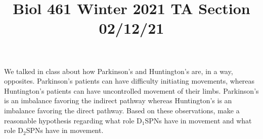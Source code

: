 \documentclass{article}
\title{Biol 461 Winter 2021 TA Section 02/12/21}
\author{}
\date{}
\begin{document}
\maketitle
\section{}
We talked in class about how Parkinson's and Huntington's are, in a way, opposites. Parkinson's patients can have difficulty initiating movements, whereas Huntington's patients can have uncontrolled movement of their limbs. Parkinson's is an imbalance favoring the indirect pathway whereas Huntington's is an imbalance favoring the direct pathway. Based on these observations, make a reasonable hypothesis regarding what role D$_1$SPNs have in movement and what role D$_2$SPNs have in movement.

\section{}
\end{document}
